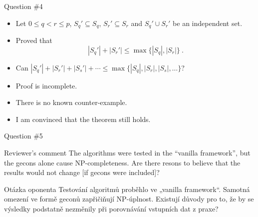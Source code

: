 \begin{frame}{Question \#4}
    \begin{itemize}
      \item Let $0 \leq q < r \leq p$,
      $S_q' \subseteq S_q$, $S_r' \subseteq S_r$
      and $S_q' \cup S_r'$ be an independent set.
      \item Proved that $$|S_q'| + |S_r'| \leq \max\{|S_q|, |S_r|\}\ .$$
      \item Can $|S_q'| + |S_r'| + |S_s'| + \cdots \leq \max\{|S_q|, |S_r|, |S_s|, \ldots\}$?
      \pause
      \item Proof is incomplete.
      \item There is no known counter-example.
      \item I am convinced that the theorem still holds.
    \end{itemize}
\end{frame}

\begin{frame}{Question \#5}
  \begin{block}{Reviewer's comment}
    The algorithms were tested in the “vanilla framework”,
    but the gecons alone cause NP-completeness.
    Are there resons to believe that the results
    would not change [if gecons were included]?
  \end{block}
  
  \begin{block}{Otázka oponenta}
    Testování algoritmů proběhlo ve „vanilla framework“.
    Samotná omezení ve formě geconů zapřičiňují NP-úplnost.
    Existují důvody pro to, že by se výsledky podstatně nezměnily
    při porovnávání vstupních dat z praxe?
  \end{block}
\end{frame}

